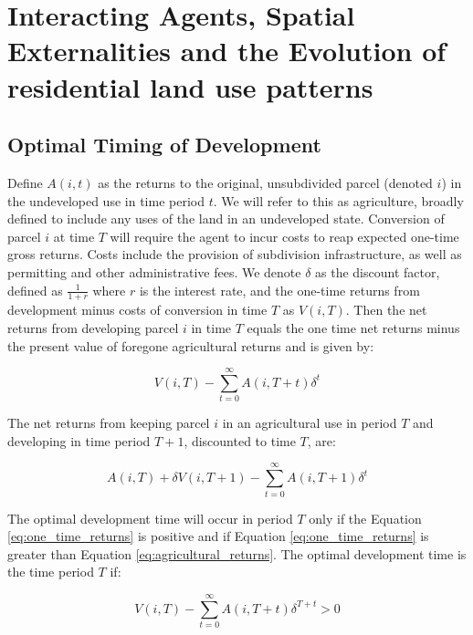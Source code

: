 \chapter{Interacting Agents, Spatial Externalities and the Evolution of residential land use patterns}

\section{Optimal Timing of Development}

Define $A(i, t)$ as the returns to the original, unsubdivided parcel (denoted $i$) in the undeveloped use in time period $t$. We will refer to this as agriculture, broadly defined to include any uses of the land in an undeveloped state. Conversion of parcel $i$ at time $T$ will require the agent to incur costs to reap expected one-time gross returns. Costs include the provision of subdivision infrastructure, as well as permitting and other administrative fees. We denote $\delta$ as the discount factor, defined as $\frac{1}{1 + r}$ where $r$ is the interest rate, and the one-time returns from development minus costs of conversion in time $T$ as $V(i, T)$. Then the net returns from developing parcel $i$ in time $T$ equals the one time net returns minus the present value of foregone agricultural returns and is given by:

\begin{equation}
    V(i, T) - \sum_{t=0}^\infty A(i, T + t) \delta^t \label{eq:one_time_returns}
\end{equation}

The net returns from keeping parcel $i$ in an agricultural use in period $T$ and developing in time period $T + 1$, discounted to time $T$, are:

\begin{equation}
    A(i, T) + \delta V(i, T+ 1) - \sum_{t=0}^\infty A(i, T + 1) \delta^t \label{eq:agricultural_returns}
\end{equation}

The optimal development time will occur in period $T$ only if the Equation \eqref{eq:one_time_returns} is positive and if Equation \eqref{eq:one_time_returns} is greater than Equation \eqref{eq:agricultural_returns}. The optimal development time is the time period $T$ if:

\begin{equation}
    V(i, T) - \sum_{t=0}^\infty A(i, T + t) \delta^{T + t} > 0 \label{eq:optimal_development}
\end{equation}

